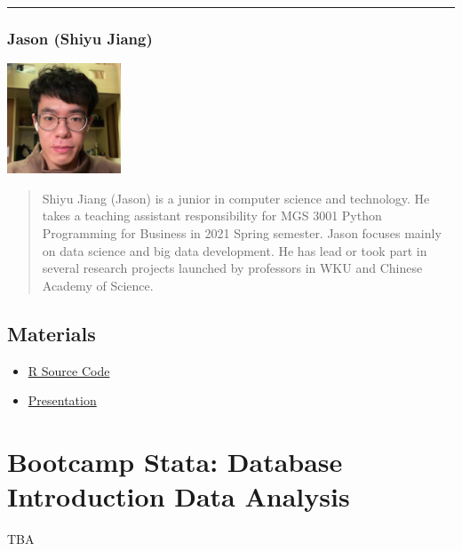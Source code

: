 \documentclass[
]{book}
\providecommand{\tightlist}{%
  \setlength{\itemsep}{0pt}\setlength{\parskip}{0pt}}
\begin{document}
\begin{center}\rule{0.5\linewidth}{0.5pt}\end{center}

\hypertarget{jason-shiyu-jiang}{%
\subsection{Jason (Shiyu Jiang)}\label{jason-shiyu-jiang}}

\includegraphics{image/ta_ja.png}

\begin{quote}
Shiyu Jiang (Jason) is a junior in computer science and technology. He takes a teaching assistant responsibility for MGS 3001 Python Programming for Business in 2021 Spring semester. Jason focuses mainly on data science and big data development. He has lead or took part in several research projects launched by professors in WKU and Chinese Academy of Science.
\end{quote}

\hypertarget{materials}{%
\section{Materials}\label{materials}}

\begin{itemize}
\tightlist
\item
  \href{https://github.com/chadchae/ws_ba_bootcamp_2021/blob/master/products/snabootcamp.R}{R Source Code}
\item
  \href{https://github.com/chadchae/ws_ba_bootcamp_2021/blob/master/products/snabootcamp.pdf}{Presentation}
\end{itemize}

\hypertarget{bootcamp-stata-database-introduction-data-analysis}{%
\chapter{Bootcamp Stata: Database Introduction Data Analysis}\label{bootcamp-stata-database-introduction-data-analysis}}

TBA
\end{document}
